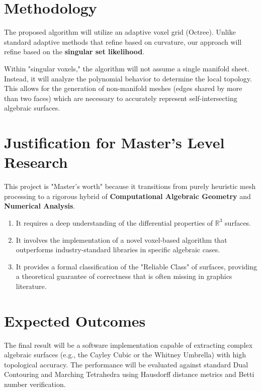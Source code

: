 \documentclass[12pt,a4paper]{article}
\begin{document}
\section{Methodology}
The proposed algorithm will utilize an adaptive voxel grid (Octree). Unlike standard adaptive methods that refine based on curvature, our approach will refine based on the \textbf{singular set likelihood}. 

Within "singular voxels," the algorithm will not assume a single manifold sheet. Instead, it will analyze the polynomial behavior to determine the local topology. This allows for the generation of non-manifold meshes (edges shared by more than two faces) which are necessary to accurately represent self-intersecting algebraic surfaces.

\section{Justification for Master's Level Research}
This project is "Master's worth" because it transitions from purely heuristic mesh processing to a rigorous hybrid of \textbf{Computational Algebraic Geometry} and \textbf{Numerical Analysis}. 
\begin{enumerate}
    \item It requires a deep understanding of the differential properties of $\mathbb{R}^3$ surfaces.
    \item It involves the implementation of a novel voxel-based algorithm that outperforms industry-standard libraries in specific algebraic cases.
    \item It provides a formal classification of the "Reliable Class" of surfaces, providing a theoretical guarantee of correctness that is often missing in graphics literature.
\end{enumerate}

\section{Expected Outcomes}
The final result will be a software implementation capable of extracting complex algebraic surfaces (e.g., the Cayley Cubic or the Whitney Umbrella) with high topological accuracy. The performance will be evaluated against standard Dual Contouring and Marching Tetrahedra using Hausdorff distance metrics and Betti number verification.
\end{document}
